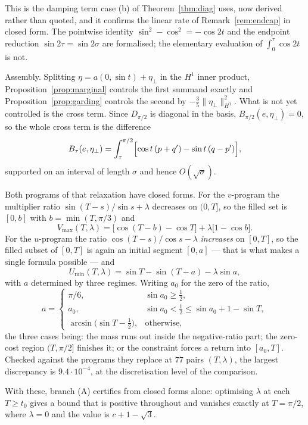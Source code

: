 \documentclass[11pt]{article}
\theoremstyle{definition}
\begin{document}
This is the damping term case (b) of Theorem~\ref{thm:diag} uses, now derived rather than
quoted, and it confirms the linear rate of Remark~\ref{rem:endcap} in closed form. The
pointwise identity $\sin^2-\cos^2=-\cos2t$ and the endpoint reduction
$\sin2\tau=\sin2\sigma$ are formalised; the elementary evaluation of $\int_0^\tau\cos2t$
is not.

Assembly. Splitting $\eta=a(0,\sin t)+\eta_\perp$ in the $H^1$ inner product,
Proposition~\ref{prop:marginal} controls the first summand exactly and
Proposition~\ref{prop:garding} controls the second by $-\tfrac35\|\eta_\perp\|^2_{H^1}$.
What is not yet controlled is the cross term. Since $D_{\pi/2}$ is diagonal in the basis,
$B_{\pi/2}(e,\eta_\perp)=0$, so the whole cross term is the difference
\[
  B_\tau(e,\eta_\perp)=\int_\tau^{\pi/2}\Bigl[\cos t\,(p+q')-\sin t\,(q-p')\Bigr] ,
\]
supported on an interval of length $\sigma$ and hence $O(\sqrt\sigma)$.

Both programs of that relaxation have closed forms. For the $v$-program the multiplier
ratio $\sin(T-s)/\sin s+\lambda$ decreases on $(0,T]$, so the filled set is $[0,b]$ with
$b=\min(T,\pi/3)$ and
\[
  V_{\max}(T,\lambda)=\bigl[\cos(T-b)-\cos T\bigr]+\lambda\bigl[1-\cos b\bigr] .
\]
For the $u$-program the ratio $\cos(T-s)/\cos s-\lambda$ \emph{increases} on $[0,T]$, so
the filled subset of $[0,T]$ is again an initial segment $[0,a]$ --- that is what makes a
single formula possible --- and
\[
  U_{\min}(T,\lambda)=\sin T-\sin(T-a)-\lambda\sin a ,
\]
with $a$ determined by three regimes. Writing $a_0$ for the zero of the ratio,
\[
  a=\begin{cases}
    \pi/6, & \sin a_0\ge\tfrac12,\\
    a_0, & \sin a_0<\tfrac12\le\sin a_0+1-\sin T,\\
    \arcsin\bigl(\sin T-\tfrac12\bigr), & \text{otherwise,}
  \end{cases}
\]
the three cases being: the mass runs out inside the negative-ratio part; the zero-cost
region $(T,\pi/2]$ finishes it; or the constraint forces a return into $[a_0,T]$. Checked
against the programs they replace at $77$ pairs $(T,\lambda)$, the largest discrepancy is
$9.4\cdot10^{-4}$, at the discretisation level of the comparison.

With these, branch (A) certifies from closed forms alone: optimising $\lambda$ at each
$T\ge t_0$ gives a bound that is positive throughout and vanishes exactly at $T=\pi/2$,
where $\lambda=0$ and the value is $c+1-\sqrt3$.
\end{document}
